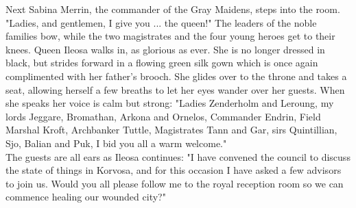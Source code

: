 Next Sabina Merrin, the commander of the Gray Maidens, steps into the room. "Ladies, and gentlemen, I give you ... the queen!" The leaders of the noble families bow, while the two magistrates and the four young heroes get to their knees. Queen Ileosa walks in, as glorious as ever. She is no longer dressed in black, but strides forward in a flowing green silk gown which is once again complimented with her father's brooch. She glides over to the throne and takes a seat, allowing herself a few breaths to let her eyes wander over her guests. When she speaks her voice is calm but strong: "Ladies Zenderholm and Leroung, my lords Jeggare, Bromathan, Arkona and Ornelos, Commander Endrin, Field Marshal Kroft, Archbanker Tuttle, Magistrates Tann and Gar, sirs Quintillian, Sjo, Balian and Puk, I bid you all a warm welcome."\\

The guests are all ears as Ileosa continues: "I have convened the council to discuss the state of things in Korvosa, and for this occasion I have asked a few advisors to join us. Would you all please follow me to the royal reception room so we can commence healing our wounded city?"\\

